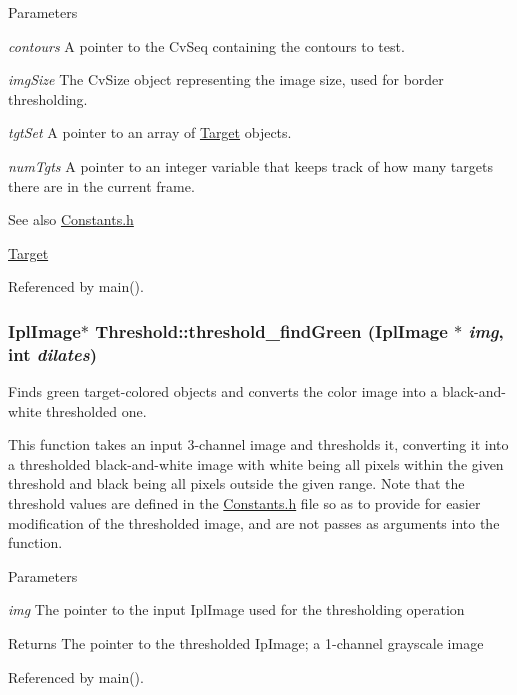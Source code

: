 \begin{DoxyParams}{Parameters}
\item[{\em contours}]A pointer to the CvSeq containing the contours to test. \item[{\em imgSize}]The CvSize object representing the image size, used for border thresholding. \item[{\em tgtSet}]A pointer to an array of \hyperlink{classTarget}{Target} objects. \item[{\em numTgts}]A pointer to an integer variable that keeps track of how many targets there are in the current frame.\end{DoxyParams}
\begin{DoxySeeAlso}{See also}
\hyperlink{Constants_8h}{Constants.h} 

\hyperlink{classTarget}{Target} 
\end{DoxySeeAlso}


Referenced by main().

\hypertarget{namespaceThreshold_a7b9d70b26f11d21f8eb737512c502fdf}{
\subsubsection[{threshold\_\-findGreen}]{\setlength{\rightskip}{0pt plus 5cm}IplImage$\ast$ Threshold::threshold\_\-findGreen (IplImage $\ast$ {\em img}, \/  int {\em dilates})}}
\label{namespaceThreshold_a7b9d70b26f11d21f8eb737512c502fdf}


Finds green target-\/colored objects and converts the color image into a black-\/and-\/white thresholded one. 

This function takes an input 3-\/channel image and thresholds it, converting it into a thresholded black-\/and-\/white image with white being all pixels within the given threshold and black being all pixels outside the given range. Note that the threshold values are defined in the \hyperlink{Constants_8h}{Constants.h} file so as to provide for easier modification of the thresholded image, and are not passes as arguments into the function.


\begin{DoxyParams}{Parameters}
\item[{\em img}]The pointer to the input IplImage used for the thresholding operation \end{DoxyParams}
\begin{DoxyReturn}{Returns}
The pointer to the thresholded IpImage; a 1-\/channel grayscale image 
\end{DoxyReturn}


Referenced by main().

